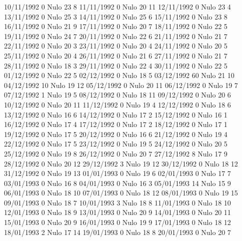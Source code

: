 10/11/1992  0     Nulo    23     8 
11/11/1992  0     Nulo    20     11 
12/11/1992  0     Nulo    23     4 
13/11/1992  0     Nulo    25     3 
14/11/1992  0     Nulo    25     6 
15/11/1992  0     Nulo    23     8 
16/11/1992  0     Nulo    21     9 
17/11/1992  0     Nulo    20     7 
18/11/1992  0     Nulo    22     5 
19/11/1992  0     Nulo    24     7 
20/11/1992  0     Nulo    22     6 
21/11/1992  0     Nulo    21     7 
22/11/1992  0     Nulo    20     3 
23/11/1992  0     Nulo    20     4 
24/11/1992  0     Nulo    20     5 
25/11/1992  0     Nulo    20     4 
26/11/1992  0     Nulo    21     6 
27/11/1992  0     Nulo    21     7 
28/11/1992  0     Nulo    18     3 
29/11/1992  0     Nulo    22     4 
30/11/1992  0     Nulo    22     5 
01/12/1992  0     Nulo    22     5 
02/12/1992  0     Nulo    18     5 
03/12/1992  60    Nulo    21     10 
04/12/1992  10    Nulo    19     12 
05/12/1992  0     Nulo    20     11 
06/12/1992  0     Nulo    19     7 
07/12/1992  1     Nulo    19     5 
08/12/1992  0     Nulo    18     11 
09/12/1992  0     Nulo    20     6 
10/12/1992  0     Nulo    20     11 
11/12/1992  0     Nulo    19     4 
12/12/1992  0     Nulo    18     6 
13/12/1992  0     Nulo    16     6 
14/12/1992  0     Nulo    17     2 
15/12/1992  0     Nulo    16     1 
16/12/1992  0     Nulo    17     4 
17/12/1992  0     Nulo    17     2 
18/12/1992  0     Nulo    17     1 
19/12/1992  0     Nulo    17     5 
20/12/1992  0     Nulo    16     6 
21/12/1992  0     Nulo    19     4 
22/12/1992  0     Nulo    17     5 
23/12/1992  0     Nulo    19     5 
24/12/1992  0     Nulo    20     5 
25/12/1992  0     Nulo    19     8 
26/12/1992  0     Nulo    20     7 
27/12/1992  8     Nulo    17     9 
28/12/1992  0     Nulo    20     12 
29/12/1992  3     Nulo    19     12 
30/12/1992  0     Nulo    18     12 
31/12/1992  0     Nulo    19     13 
01/01/1993  0     Nulo    19     6 
02/01/1993  0     Nulo    17     7 
03/01/1993  0     Nulo    16     8 
04/01/1993  0     Nulo    16     3 
05/01/1993  14    Nulo    15     9 
06/01/1993  0     Nulo    18     10 
07/01/1993  0     Nulo    18     12 
08/01/1993  0     Nulo    19     15 
09/01/1993  0     Nulo    18     7 
10/01/1993  3     Nulo    18     8 
11/01/1993  0     Nulo    18     10 
12/01/1993  0     Nulo    18     9 
13/01/1993  0     Nulo    20     9 
14/01/1993  0     Nulo    20     11 
15/01/1993  0     Nulo    20     9 
16/01/1993  0     Nulo    19     9 
17/01/1993  0     Nulo    18     12 
18/01/1993  2     Nulo    17     14 
19/01/1993  0     Nulo    18     8 
20/01/1993  0     Nulo    20     7 
